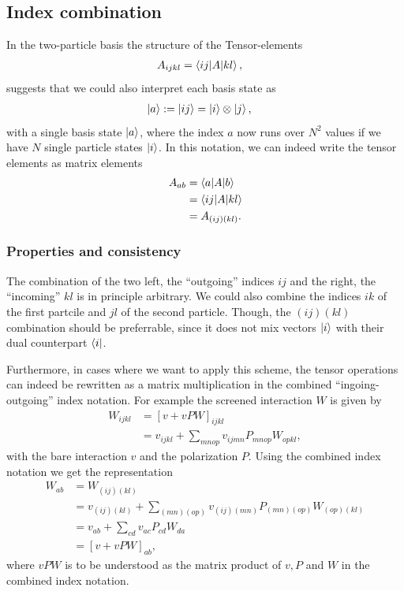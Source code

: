 \documentclass[12pt,a4paper]{scrartcl}
\numberwithin{equation}{section}
\begin{document}
\subsection{Index combination}
In the two-particle basis the structure of the Tensor-elements
\begin{align}
 A_{ijkl} &= \braket{ij | A | kl } ,
\end{align}
suggests that we could also interpret each basis state as
\begin{align}
 \ket{a} := \ket{ ij } &= \ket{i}\otimes \ket{j} ,
\end{align}
with a single basis state $\ket{a}$, where the index $a$ now runs over $N^2$ values
if we have $N$ single particle states $\ket{i}$. In this notation, we can indeed write the tensor elements
as matrix elements
\begin{align}
 A_{ab} &= \braket{a | A | b } \\
 &= \braket{ij | A | kl }   \\
  &= A_{(ij)(kl)} .
\end{align}

\subsubsection{Properties and consistency}

The combination of the two left, the ``outgoing'' indices $ij$ and the right, the ``incoming'' $kl$ is in principle arbitrary.
We could also combine the indices $ik$ of the first partcile and $jl$ of the second particle. 
Though, the $(ij)(kl)$ combination should be preferrable, since it does not mix vectors $\ket{i}$ with their
dual counterpart $\bra{i}$. 

Furthermore, in cases where we want to apply this scheme, the tensor operations can indeed be rewritten
as a matrix multiplication in the combined ``ingoing-outgoing'' index notation. For example
the screened interaction $W$ is given by
\begin{align}
W_{ijkl} &= [ v + vPW ]_{ijkl} \\
&= v_{ijkl} + \sum_{mnop} v_{ijmn}P_{mnop}W_{opkl},
\end{align}
with the bare interaction $v$ and the polarization $P$. Using the combined index notation we get the representation
\begin{align}
W_{ab} &= W_{(ij)(kl)} \\
&= v_{(ij)(kl)} + \sum_{(mn)(op)} v_{(ij)(mn)}P_{(mn)(op)}W_{(op)(kl)} \\
&= v_{ab} + \sum_{cd} v_{ac}P_{cd}W_{da} \\
&= [v + vPW]_{ab},
\end{align}
where $vPW$ is to be understood as the matrix product of $v,P$ and $W$ in the combined index notation.
\end{document}
